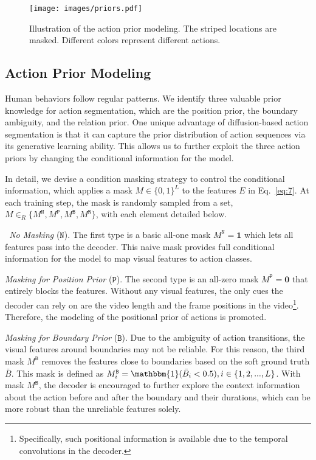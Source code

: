 \documentclass[10pt,twocolumn,letterpaper]{article}
\begin{document}
\begin{figure}[t]
\begin{center}
   \texttt{[image: images/priors.pdf]}
\end{center}
   \caption{Illustration of the action prior modeling. The striped locations are masked. Different colors represent different actions.}
\label{fig:priors}
\end{figure}

\subsection{Action Prior Modeling}

Human behaviors follow regular patterns.
We identify three valuable prior knowledge for action segmentation, which are the position prior, the boundary ambiguity, and the relation prior.
One unique advantage of diffusion-based action segmentation is that it can capture the prior distribution of action sequences via its generative learning ability.
This allows us to further exploit the three action priors by changing the conditional information for the model.

In detail, we devise a condition masking strategy to control the conditional information, which applies a mask $M \in \{0,1\}^{L}$ to the features $E$ in Eq.~\ref{eq:7}.
At each training step, the mask is randomly sampled from a set, $M \in_R \{M^\mathtt{N}, M^\mathtt{P}, M^\mathtt{B}, M^\mathtt{R}\}$, with each element detailed below.

\textit{ No Masking} ($\mathtt{N}$). 
The first type is a basic all-one mask $M^\mathtt{N} = \boldsymbol{1}$ which lets all features pass into the decoder. 
This naive mask provides full conditional information for the model to map visual features to action classes.

\textit{Masking for Position Prior} ($\mathtt{P}$). 
The second type is an all-zero mask $M^\mathtt{P} = \boldsymbol{0}$ that entirely blocks the features.
Without any visual features, the only cues the decoder can rely on are the video length and the frame positions in the video\footnote{Specifically, such positional information is available due to the temporal convolutions in the decoder.}. 
Therefore, the modeling of the positional prior of actions is promoted.


\textit{Masking for Boundary Prior} ($\mathtt{B}$). 
Due to the ambiguity of action transitions, the visual features around boundaries may not be reliable.
For this reason, the third mask $M^\mathtt{B}$ removes the features close to boundaries based on the soft ground truth $\bar{B}$.
This mask is defined as $M^\mathtt{B}_i = \mathbbm{1}(\bar{B}_i<0.5), i \in \{1,2,...,L\}$.
With mask $M^\mathtt{B}$, the decoder is encouraged to further explore the context information about the action before and after the boundary and their durations, which can be more robust than the unreliable features solely.
\end{document}

